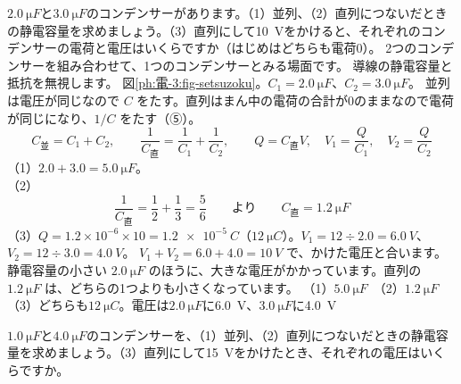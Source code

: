 \label{ph:電-3:ex3}
\begin{phreidai}
$\qty{2.0}{\micro F}$と$\qty{3.0}{\micro F}$のコンデンサーがあります。（1）並列、（2）直列につないだときの静電容量を求めましょう。（3）直列にして\qty{10}{V}をかけると、それぞれのコンデンサーの電荷と電圧はいくらですか（はじめはどちらも電荷0）。
\phbamen
2つのコンデンサーを組み合わせて、1つのコンデンサーとみる場面です。
\phmushi
導線の静電容量と抵抗を無視します。
\phzu
図\ref{ph:電-3:fig-setsuzoku}。$C_1=\qty{2.0}{\micro F}$、$C_2=\qty{3.0}{\micro F}$。
\phriyu
並列は電圧が同じなので $C$ をたす。直列はまん中の電荷の合計が0のままなので電荷が同じになり、$1/C$ をたす（⑤）。
\phtateru
\[C_{\text{並}}=C_1+C_2,\qquad\frac1{C_{\text{直}}}=\frac1{C_1}+\frac1{C_2},\qquad Q=C_{\text{直}}V,\quad V_1=\frac{Q}{C_1},\quad V_2=\frac{Q}{C_2}\]
\phtoku
（1）$2.0+3.0=\qty{5.0}{\micro F}$。\\
（2）\[\frac1{C_{\text{直}}}=\frac12+\frac13=\frac56\qquad\text{より}\qquad C_{\text{直}}=\qty{1.2}{\micro F}\]
（3）$Q=1.2\times10^{-6}\times10=\qty{1.2e-5}{C}$（$\qty{12}{\micro C}$）。$V_1=12\div2.0=\qty{6.0}{V}$、$V_2=12\div3.0=\qty{4.0}{V}$。
\phtashikame
$V_1+V_2=6.0+4.0=\qty{10}{V}$ で、かけた電圧と合います。静電容量の小さい $\qty{2.0}{\micro F}$ のほうに、大きな電圧がかかっています。直列の $\qty{1.2}{\micro F}$ は、どちらの1つよりも小さくなっています。
\kotae （1）$\qty{5.0}{\micro F}$　（2）$\qty{1.2}{\micro F}$　（3）どちらも$\qty{12}{\micro C}$。電圧は$\qty{2.0}{\micro F}$に\qty{6.0}{V}、$\qty{3.0}{\micro F}$に\qty{4.0}{V}
\end{phreidai}
\begin{jibun}
$\qty{1.0}{\micro F}$と$\qty{4.0}{\micro F}$のコンデンサーを、（1）並列、（2）直列につないだときの静電容量を求めましょう。（3）直列にして\qty{15}{V}をかけたとき、それぞれの電圧はいくらですか。
\end{jibun}

